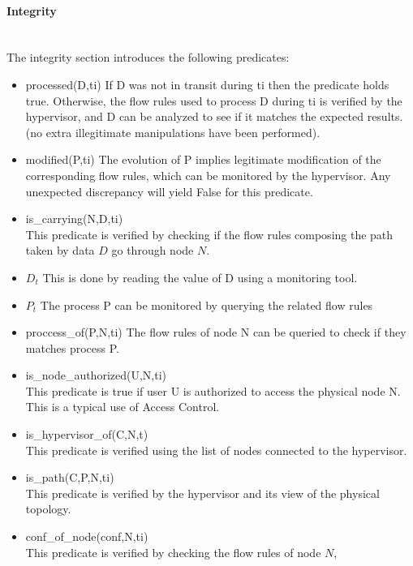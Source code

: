\paragraph{Integrity}\textbf{\\}
The integrity section introduces the following predicates:
\begin{itemize}

\item processed(D,ti)
\newline
If D was not in transit during ti then the predicate holds true.
Otherwise, the flow rules used to process D during ti is verified by the hypervisor, and D can be analyzed to see if it matches the expected results. (\ie no extra illegitimate manipulations have been performed).

\item modified(P,ti)
\newline
The evolution of P implies legitimate modification of the corresponding flow rules, which can be monitored by the hypervisor. Any unexpected discrepancy will yield False for this predicate.

\item is\_carrying(N,D,ti)\\
This predicate is verified by checking if the flow rules composing the path taken by data $D$ go through node $N$.


\item $D_{t}$
\newline
This is done by reading the value of D using a monitoring tool.

\item $P_t$
\newline
The process P can be monitored by querying the related flow rules

\item proccess\_of(P,N,ti)
\newline
The flow rules of node N can be queried to check if they matches process P.

\item is\_node\_authorized(U,N,ti)\\
This predicate is true if user U is authorized to access the physical node N.
This is a typical use of Access Control.

\item is\_hypervisor\_of(C,N,t)\\
This predicate is verified using the list of nodes connected to the hypervisor.

\item is\_path(C,P,N,ti)\\
This predicate  is verified by the hypervisor and its view of the physical topology.

\item conf\_of\_node(conf,N,ti)\\
This predicate  is verified by checking the flow rules of node $N$,

\end{itemize}

